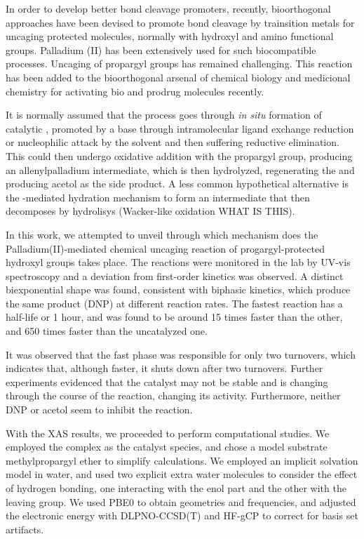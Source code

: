 In order to develop better  bond cleavage promoters,
recently, bioorthogonal approaches have been devised to promote  bond
cleavage by trainsition metals for uncaging protected molecules, normally with
hydroxyl and amino functional groups.
Palladium (II) has been extensively used for such biocompatible processes.
Uncaging of propargyl groups has remained challenging.
This reaction has been added to the bioorthogonal arsenal of chemical biology and
medicional chemistry for activating bio and prodrug molecules recently.

It is normally assumed that the process goes through \emph{in situ} formation
of catalytic , promoted by a base through intramolecular ligand exchange
reduction or nucleophilic attack by the solvent and then suffering reductive
elimination.
This  could then undergo oxidative addition with the
propargyl group, producing an allenylpalladium intermediate, which is then
hydrolyzed, regenerating the  and producing acetol as the side product.
A less common hypothetical alternative is the -mediated hydration
mechanism to form an intermediate that then decomposes by hydrolisys
(Wacker-like oxidation WHAT IS THIS).

In this work, we attempted to unveil through which mechanism does
the Palladium(II)-mediated chemical uncaging reaction of
progargyl-protected hydroxyl groups takes place.
The reactions were monitored in the lab by UV-vis spectroscopy and a deviation
from first-order kinetics was observed.
A distinct biexponential shape was found, consistent with biphasic kinetics,
which produce the same product (DNP) at different reaction rates.
The fastest reaction has a half-life or 1 hour, and was found to be around 15 times faster than the other, and
650 times faster than the uncatalyzed one.

It was observed that the fast phase was responsible for only two turnovers,
which indicates that, although faster, it shuts down after two turnovers.
Further experiments evidenced that the catalyst may not be stable and is changing through the
course of the reaction, changing its activity.
Furthermore, neither DNP or acetol seem to inhibit the reaction.

With the XAS results, we proceeded to perform computational studies.
We employed the  complex as the catalyst species, and chose a
model substrate methylpropargyl ether to simplify calculations.
We employed an implicit solvation model in water, and used two explicit extra
water molecules to consider the effect of hydrogen bonding, one interacting
with the enol part and the other with the leaving group.
We used PBE0 to obtain geometries and frequencies, and adjusted the electronic
energy with DLPNO-CCSD(T) and HF-gCP to correct for basis set artifacts.

